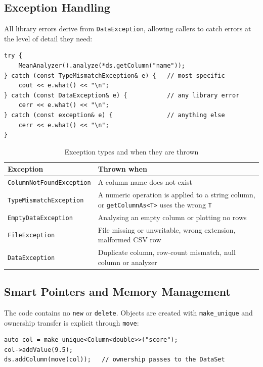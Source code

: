\documentclass[11pt,a4paper]{article}
\newcommand{\code}[1]{\texttt{#1}}
\begin{document}
\subsection{Exception Handling}

All library errors derive from \code{DataException}, allowing callers to catch errors at the level
of detail they need:

\begin{lstlisting}
try {
    MeanAnalyzer().analyze(*ds.getColumn("name"));
} catch (const TypeMismatchException& e) {   // most specific
    cout << e.what() << "\n";
} catch (const DataException& e) {           // any library error
    cerr << e.what() << "\n";
} catch (const exception& e) {               // anything else
    cerr << e.what() << "\n";
}
\end{lstlisting}

\begin{table}[H]
\centering
\caption{Exception types and when they are thrown}
\begin{tabularx}{\textwidth}{@{}l L@{}}
\toprule
\textbf{Exception} & \textbf{Thrown when} \\
\midrule
\code{ColumnNotFoundException} & A column name does not exist \\
\code{TypeMismatchException} & A numeric operation is applied to a string column, or \code{getColumnAs<T>} uses the wrong \code{T} \\
\code{EmptyDataException} & Analysing an empty column or plotting no rows \\
\code{FileException} & File missing or unwritable, wrong extension, malformed CSV row \\
\code{DataException} & Duplicate column, row-count mismatch, null column or analyzer \\
\bottomrule
\end{tabularx}
\end{table}

\subsection{Smart Pointers and Memory Management}

The code contains no \code{new} or \code{delete}. Objects are created with \code{make\_unique}
and ownership transfer is explicit through \code{move}:

\begin{lstlisting}
auto col = make_unique<Column<double>>("score");
col->addValue(9.5);
ds.addColumn(move(col));   // ownership passes to the DataSet
\end{lstlisting}
\end{document}
